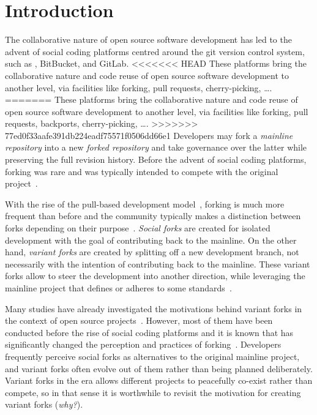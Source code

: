 \section{Introduction}
\label{sec:intro}

The collaborative nature of open source software development has led to the advent of social coding platforms centred around the git version control system, such as \gh, BitBucket, and GitLab.
<<<<<<< HEAD
These platforms bring the collaborative nature and code reuse of open source software development to another level, via facilities like forking, pull requests, cherry-picking, \ldots.
=======
These platforms bring the collaborative nature and code reuse of open source software development to another level, via facilities like forking, pull requests, backports, cherry-picking, \ldots.
>>>>>>> 77ed0f33aafe391db224eadf75571f0506dd66e1
Developers may fork a \textit{mainline repository} into a new \textit{forked repository} and take governance over the latter while preserving the full revision history.
Before the advent of social coding platforms, forking was rare and was typically intended to compete with the original project~\cite{Linus:2012Perspectives,Gregorio:2012,Viseur:2012Forks,Linus:2013CodeForking,Linus:2011ToFork,Gamalielsson:2014Sustainability}.

With the rise of the pull-based development model~\cite{Gousios:2014ICSE}, forking is much more frequent than before and the community typically makes a distinction between forks depending on their purpose~\cite{Zhou:2020}.
\textit{Social forks} are created for isolated development with the goal of contributing back to the mainline.
On the other hand, \textit{variant forks} are created by splitting off a new development branch, not necessarily with the intention of contributing back to the mainline.
These variant forks allow to steer the development into another direction, while leveraging the mainline project that defines or adheres to some standards~\cite{sung:ICSE:2020}.

Many studies have already investigated the motivations behind variant forks in the context of open source projects~\cite{Linus:2012Perspectives,Gregorio:2012,Viseur:2012Forks,Linus:2013CodeForking,Linus:2011ToFork,Gamalielsson:2014Sustainability}.
However, most of them have been conducted before the rise of social coding platforms and it is known that \gh has significantly changed the perception and practices of forking~\cite{Zhou:2020}.
Developers frequently perceive social forks as alternatives to the original mainline project, and variant forks often evolve out of them rather than being planned deliberately.
Variant forks in the \gh era allows different projects to peacefully co-exist rather than compete, so in that sense it is worthwhile to revisit the motivation for creating variant forks (\textit{why?}).

